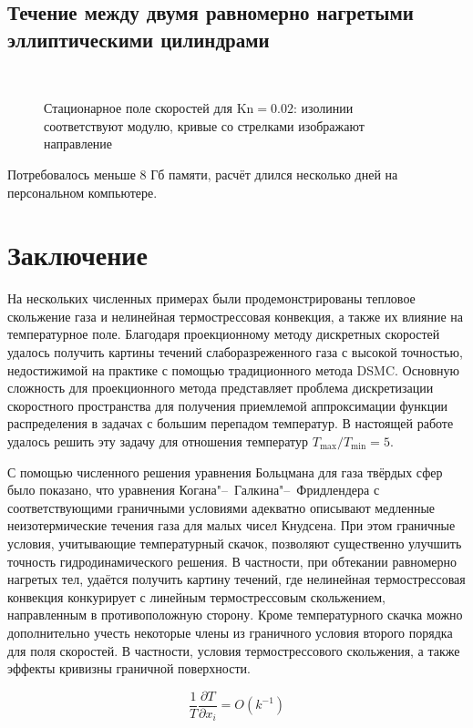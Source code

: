 \documentclass[
aps,%
12pt,%
final,%
notitlepage,%
oneside,%
onecolumn,%
nobibnotes,%
nofootinbib,%
superscriptaddress,%
noshowpacs,%
showkeys,%
centertags]%
{revtex4}
\newcommand{\Kn}{\mathrm{Kn}}
\newcommand{\pder}[2][]{\frac{\partial#1}{\partial#2}}
\newcommand{\OO}[1]{O(#1)}
\begin{document}
\subsection{Течение между двумя равномерно нагретыми эллиптическими цилиндрами}

\begin{figure}
    \centering
    \\
\end{figure}
\begin{figure}
    \ContinuedFloat %
    \caption{Стационарное поле скоростей для \(\Kn=0.02\):
        изолинии соответствуют модулю, кривые со стрелками изображают направление}
    \label{fig:elliptic:flow}
\end{figure}

Потребовалось меньше 8 Гб памяти, расчёт длился несколько дней на персональном компьютере.

\section{Заключение}

На нескольких численных примерах были продемонстрированы тепловое скольжение газа
и нелинейная термострессовая конвекция, а также их влияние на температурное поле.
Благодаря проекционному методу дискретных скоростей удалось получить картины течений
слаборазреженного газа с высокой точностью, недостижимой на практике с помощью традиционного метода DSMC.
Основную сложность для проекционного метода представляет проблема дискретизации скоростного пространства
для получения приемлемой аппроксимации функции распределения в задачах с большим перепадом температур.
В настоящей работе удалось решить эту задачу для отношения температур \(T_{\max}/T_{\min}=5\).

С помощью численного решения уравнения Больцмана для газа твёрдых сфер было показано,
что уравнения Когана"--~Галкина"--~Фридлендера с соответствующими граничными условиями адекватно описывают
медленные неизотермические течения газа для малых чисел Кнудсена.
При этом граничные условия, учитывающие температурный скачок, позволяют
существенно улучшить точность гидродинамического решения.
В частности, при обтекании равномерно нагретых тел, удаётся получить картину течений,
где нелинейная термострессовая конвекция конкурирует с линейным термострессовым скольжением,
направленным в противоположную сторону.
Кроме температурного скачка можно дополнительно учесть некоторые члены из граничного условия
второго порядка для поля скоростей. В частности, условия термострессового скольжения,
а также эффекты кривизны граничной поверхности.

\begin{equation}
    \frac1T\pder[T]{x_i} = \OO{k^{-1}}
\end{equation}



\end{document}
